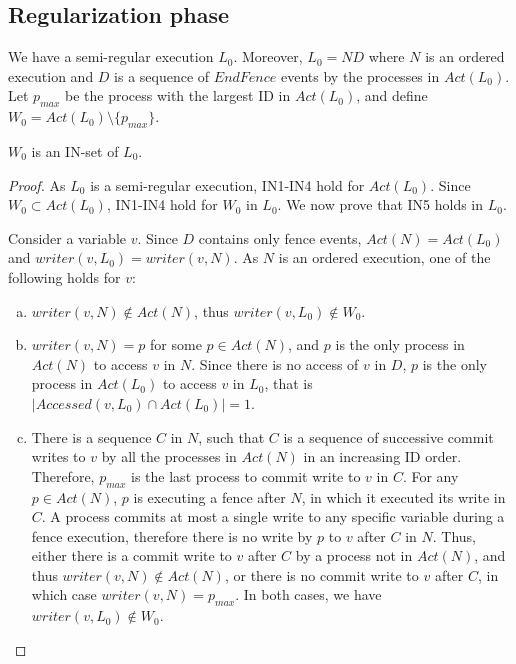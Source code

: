 \subsection{Regularization phase}
We have a semi-regular execution $L_0$. Moreover, $L_0 = N D$ where $N$ is an ordered execution and $D$ is a sequence of $EndFence$ events by the processes in $Act(L_0)$. Let $p_{max}$ be the process with the largest ID in $Act(L_0)$, and define $W_0 = Act(L_0) \setminus \{p_{max}\}$.

\begin{claim-subsection} \label{claim: W_0-is-an-IN-set}
	$W_0$ is an IN-set of $L_0$.
\end{claim-subsection}

\begin{proof}
	As $L_0$ is a semi-regular execution, IN1-IN4 hold for $Act(L_0)$. Since $W_0 \subset Act(L_0)$, IN1-IN4 hold for $W_0$ in $L_0$. We now prove that IN5 holds in $L_0$.
	
	Consider a variable $v$. Since $D$ contains only fence events, $Act(N) = Act(L_0)$ and $writer(v,L_0) = writer(v,N)$. As $N$ is an ordered execution, one of the following holds for $v$:
	\begin{enumerate} [(a)]
		\item $writer(v,N) \notin Act(N)$, thus $writer(v,L_0) \notin W_0$.
		\item $writer(v,N) = p$ for some $p \in Act(N)$, and $p$ is the only process in $Act(N)$ to access $v$ in $N$. Since there is no access of $v$ in $D$, $p$ is the only process in $Act(L_0)$ to access $v$ in $L_0$, that is $|Accessed(v,L_0) \cap Act(L_0)| = 1$.
		\item There is a sequence $C$ in $N$, such that $C$ is a sequence of successive commit writes to $v$ by all the processes in $Act(N)$ in an increasing ID order. Therefore, $p_{max}$ is the last process to commit write to $v$ in $C$. For any $p \in Act(N)$, $p$ is executing a fence after $N$, in which it executed its write in $C$. A process commits at most a single write to any specific variable during a fence execution, therefore there is no write by $p$ to $v$ after $C$ in $N$. Thus, either there is a commit write to $v$ after $C$ by a process not in $Act(N)$, and thus $writer(v,N) \notin Act(N)$, or there is no commit write to $v$ after $C$, in which case $writer(v,N) = p_{max}$. In both cases, we have $writer(v,L_0) \notin W_0$.
	\end{enumerate}
\end{proof}


